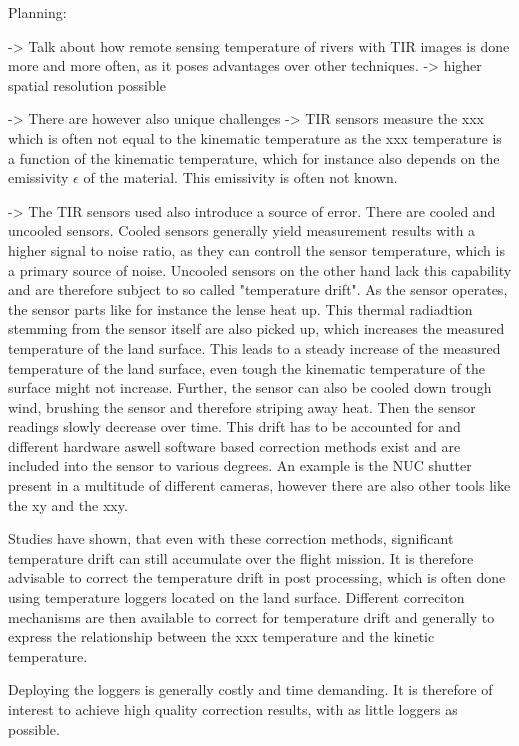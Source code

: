 Planning:


-> Talk about how remote sensing temperature of rivers with TIR images is done more and more often, as it poses advantages over other techniques.
-> higher spatial resolution possible

-> There are however also unique challenges
-> TIR sensors measure the xxx which is often not equal to the kinematic temperature as the xxx temperature is a function of the kinematic temperature, which for instance also depends on the emissivity $\epsilon$ of the material. This emissivity is often not known.

-> The TIR sensors used also introduce a source of error. There are cooled and uncooled sensors. Cooled sensors generally yield measurement results with a higher signal to noise ratio, as they can controll the sensor temperature, which is a primary source of noise. Uncooled sensors on the other hand lack this capability and are therefore subject to so called "temperature drift". As the sensor operates, the sensor parts like for instance the lense heat up. This thermal radiadtion stemming from the sensor itself are also picked up, which increases the measured temperature of the land surface. This leads to a steady increase of the measured temperature of the land surface, even tough the kinematic temperature of the surface might not increase. Further, the sensor can also be cooled down trough wind, brushing the sensor and therefore striping away heat. Then the sensor readings slowly decrease over time. This drift has to be accounted for and different hardware aswell software based correction methods exist and are included into the sensor to various degrees. An example is the NUC shutter present in a multitude of different cameras, however there are also other tools like the xy and the xxy.

Studies have shown, that even with these correction methods, significant temperature drift can still accumulate over the flight mission. It is therefore advisable to correct the temperature drift in post processing, which is often done using temperature loggers located on the land surface. Different correciton mechanisms are then available to correct for temperature drift and generally to express the relationship between the xxx temperature and the kinetic temperature.

Deploying the loggers is generally costly and time demanding. It is therefore of interest to achieve high quality correction results, with as little loggers as possible.



